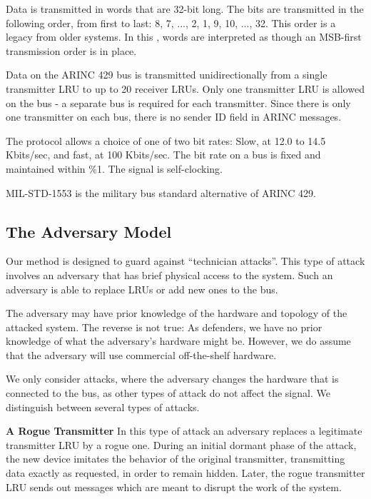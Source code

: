 \documentclass[english]{llncs}
\newcommand{\sublevel}[1]{\subsection{#1}}
\newcommand{\sublevel}[1]{\section{#1}}
\begin{document}
  Data is transmitted in words that are 32-bit long. The bits are transmitted in the following order, from first to last: 8, 7, ..., 2, 1, 9, 10, ..., 32. This order is a legacy from older systems. In this \iftoggle{paper} {paper} {work}, words are interpreted as though an MSB-first transmission order is in place.
  
  Data on the ARINC 429 bus is transmitted unidirectionally from a single transmitter LRU to up to 20 receiver LRUs. Only one transmitter LRU is allowed on the bus - a separate bus is required for each transmitter. Since there is only one transmitter on each bus, there is no sender ID field in ARINC messages.
   
  The protocol allows a choice of one of two bit rates: Slow, at 12.0 to 14.5 Kbits/sec, and fast, at 100 Kbits/sec. The bit rate on a bus is fixed and maintained within \%1. The signal is self-clocking.
  
  MIL-STD-1553 \cite{united1986milstd1553} is the military bus standard alternative of ARINC 429.

\vspace*{-2ex} %
\sublevel{The Adversary Model}
  Our method is designed to guard against ``technician attacks''. This type of attack involves an adversary that has brief physical access to the system. Such an adversary is able to replace LRUs or add new ones to the bus.
  
  The adversary may have prior knowledge of the hardware and topology of the attacked system. The reverse is not true: As defenders, we have no prior knowledge of what the adversary's hardware might be. However, we do assume that the adversary will use commercial off-the-shelf hardware.
  
  We only consider attacks, where the adversary changes the hardware that is connected to the bus, as other types of attack do not affect the signal. %
  We distinguish between several types of attacks.

  \textbf{A Rogue Transmitter}
  In this type of attack an adversary replaces a legitimate transmitter LRU by a rogue one. During an initial dormant phase of the attack, the new device imitates the behavior of the original transmitter, transmitting data exactly as requested, in order to remain hidden. 
  Later,
  the rogue transmitter LRU sends out messages which are meant to disrupt the work of the system.
  
\end{document}
